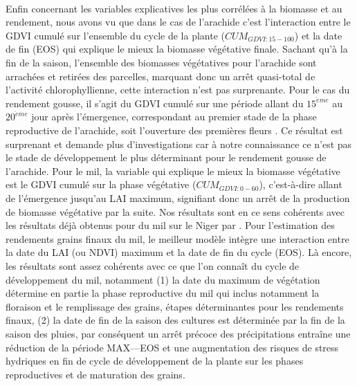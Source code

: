 \\Enfin concernant les variables explicatives les plus corrélées à la biomasse et au rendement, nous avons vu que dans le cas de l’arachide c’est l’interaction entre le GDVI cumulé sur l’ensemble du cycle de la plante ($CUM_{GDVI:15-100}$) et la date de fin (EOS) qui explique le mieux la biomasse végétative finale. Sachant qu’à la fin de la saison,
l’ensemble des biomasses végétatives pour l’arachide sont arrachées et retirées des parcelles, marquant donc un arrêt quasi-total de l’activité chlorophyllienne, cette interaction n’est pas surprenante. Pour le cas du rendement gousse, il s’agit du GDVI cumulé sur une période allant du $15^{\grave{e}me}$ au $20^{\grave{e}me}$ jour après l’émergence, correspondant au premier stade de la phase reproductive de l’arachide, soit l’ouverture des premières fleurs \citep{Boote1982}. Ce résultat est surprenant et demande plus d’investigations car à notre connaissance ce n’est pas le stade de développement le plus
déterminant pour le rendement gousse de l’arachide. Pour le mil, la variable qui explique le mieux la biomasse végétative est le GDVI cumulé sur la phase végétative ($CUM_{GDVI:0-60}$), c’est-à-dire allant de l’émergence jusqu’au LAI maximum, signifiant donc un arrêt de la production de biomasse végétative par la suite. Nos résultats sont
en ce sens cohérents avec les résultats déjà obtenus pour du mil sur le Niger par \citet{Leroux2016}. Pour l’estimation des rendements grains finaux du mil, le meilleur modèle intègre une interaction entre la date du LAI (ou NDVI) maximum et la date de fin du cycle (EOS). Là encore, les résultats sont assez cohérents avec ce que l’on connaît du cycle de développement du mil, notamment (1) la date du maximum de végétation détermine en partie la phase reproductive du mil qui inclus notamment
la floraison et le remplissage des grains, étapes déterminantes pour les rendements finaux, (2) la date de fin de la saison des cultures est déterminée par la fin de la saison des pluies, par conséquent un arrêt précoce des précipitations entraîne une réduction de la période MAX---EOS et une augmentation des risques de stress hydriques en fin de cycle de développement de la plante sur les phases reproductives et de maturation des grains.
